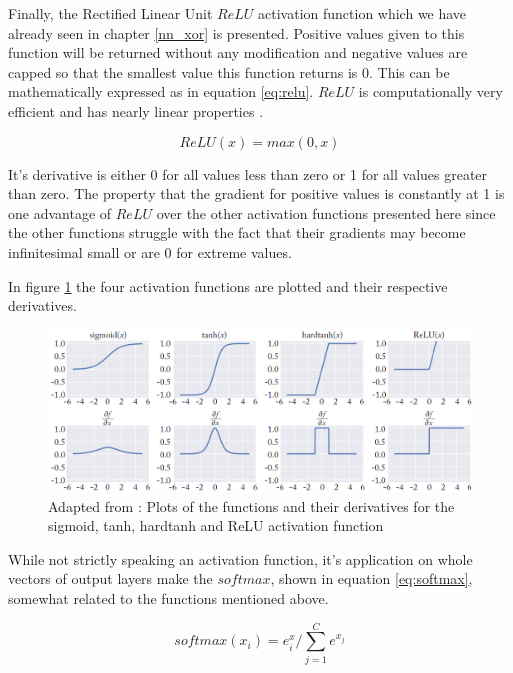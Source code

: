 Finally, the Rectified Linear Unit $ReLU$ activation function which we have already seen in chapter \ref{nn_xor} is presented. 
Positive values given to this function will be returned without any modification and negative values are capped so that the smallest value this function returns is 0. This can be mathematically expressed as in equation \ref{eq:relu}. 
$ReLU$ is computationally very efficient and has nearly linear properties \citep{jurafsky2021}. 

\begin{equation}
\label{eq:relu}
    ReLU(x) = max(0, x)
\end{equation}

It's derivative is either 0 for all values less than zero or 1 for all values greater than zero. 
The property that the gradient for positive values is constantly at 1 is one advantage of $ReLU$ over the other activation functions presented here since the other functions struggle with the fact that their gradients may become infinitesimal small or are 0 for extreme values.

In figure \ref{fig:AF} the four activation functions are plotted and their respective derivatives.

\begin{figure}
  \includegraphics[width=\linewidth]{Pictures/Goldberg_17_AF.png}
  \caption{Adapted from \citet{goldberg2017neural}: Plots of the functions and their derivatives for the sigmoid, tanh, hardtanh and ReLU activation function}
  \label{fig:AF}
\end{figure}

While not strictly speaking an activation function, it's application on whole vectors of output layers make the $softmax$, shown in equation \ref{eq:softmax}, somewhat related to the functions mentioned above. 

\begin{equation}
\label{eq:softmax}
    softmax(x_i) = e^x_i / \sum_{j=1}^{C} e^{x_j}
\end{equation}

